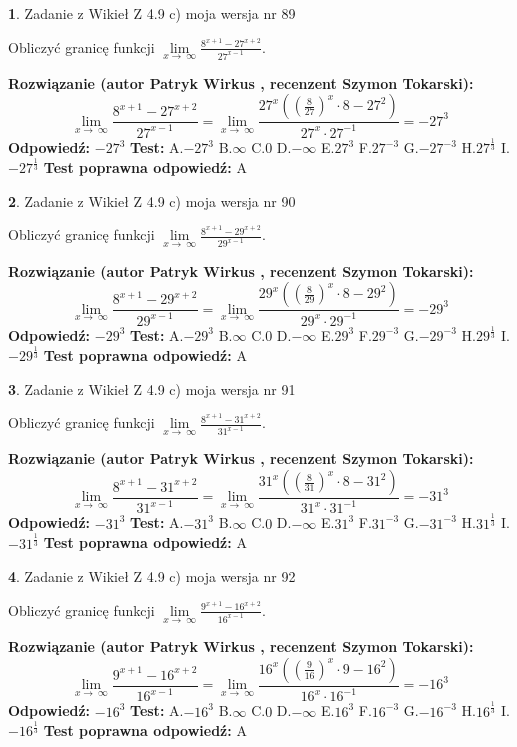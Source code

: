 \documentclass[12pt, a4paper]{article}
\theoremstyle{definition} %
\newtheorem{zad}{}
\newcommand{\zadStart}[1]{\begin{zad}#1\newline}
\newcommand{\zadStop}{\end{zad}}
\newcommand{\rozwStart}[2]{\noindent \textbf{Rozwiązanie (autor #1 , recenzent #2): }\newline}
\newcommand{\rozwStop}{\newline}
\newcommand{\odpStart}{\noindent \textbf{Odpowiedź:}\newline}
\newcommand{\odpStop}{\newline}
\newcommand{\testStart}{\noindent \textbf{Test:}\newline}
\newcommand{\testStop}{\newline}
\newcommand{\kluczStart}{\noindent \textbf{Test poprawna odpowiedź:}\newline}
\newcommand{\kluczStop}{\newline}
\begin{document}
\zadStart{Zadanie z Wikieł Z 4.9 c) moja wersja nr 89}


Obliczyć granicę funkcji  $\lim\limits_{x\to\ \infty}\frac{8^{x+1}-27^{x+2}}{27^{x-1}}$.
\zadStop
\rozwStart{Patryk Wirkus}{Szymon Tokarski}
$$\lim\limits_{x\to\ \infty}\frac{8^{x+1}-27^{x+2}}{27^{x-1}}=\lim\limits_{x\to\ \infty}\frac{27^{x}((\frac{8}{27})^{x}\cdot 8 -27^{2})}{27^{x}\cdot 27^{-1}} = -27^{3}$$
\rozwStop
\odpStart
$-27^{3}$
\odpStop
\testStart
A.$-27^{3}$ B.$\infty$ C.$0$ D.$-\infty$ E.$27^{3}$
F.$27^{-3}$ G.$-27^{-3}$
H.$27^{\frac{1}{3}}$
I.$-27^{\frac{1}{3}}$
\testStop
\kluczStart
A
\kluczStop



\zadStart{Zadanie z Wikieł Z 4.9 c) moja wersja nr 90}


Obliczyć granicę funkcji  $\lim\limits_{x\to\ \infty}\frac{8^{x+1}-29^{x+2}}{29^{x-1}}$.
\zadStop
\rozwStart{Patryk Wirkus}{Szymon Tokarski}
$$\lim\limits_{x\to\ \infty}\frac{8^{x+1}-29^{x+2}}{29^{x-1}}=\lim\limits_{x\to\ \infty}\frac{29^{x}((\frac{8}{29})^{x}\cdot 8 -29^{2})}{29^{x}\cdot 29^{-1}} = -29^{3}$$
\rozwStop
\odpStart
$-29^{3}$
\odpStop
\testStart
A.$-29^{3}$ B.$\infty$ C.$0$ D.$-\infty$ E.$29^{3}$
F.$29^{-3}$ G.$-29^{-3}$
H.$29^{\frac{1}{3}}$
I.$-29^{\frac{1}{3}}$
\testStop
\kluczStart
A
\kluczStop



\zadStart{Zadanie z Wikieł Z 4.9 c) moja wersja nr 91}


Obliczyć granicę funkcji  $\lim\limits_{x\to\ \infty}\frac{8^{x+1}-31^{x+2}}{31^{x-1}}$.
\zadStop
\rozwStart{Patryk Wirkus}{Szymon Tokarski}
$$\lim\limits_{x\to\ \infty}\frac{8^{x+1}-31^{x+2}}{31^{x-1}}=\lim\limits_{x\to\ \infty}\frac{31^{x}((\frac{8}{31})^{x}\cdot 8 -31^{2})}{31^{x}\cdot 31^{-1}} = -31^{3}$$
\rozwStop
\odpStart
$-31^{3}$
\odpStop
\testStart
A.$-31^{3}$ B.$\infty$ C.$0$ D.$-\infty$ E.$31^{3}$
F.$31^{-3}$ G.$-31^{-3}$
H.$31^{\frac{1}{3}}$
I.$-31^{\frac{1}{3}}$
\testStop
\kluczStart
A
\kluczStop



\zadStart{Zadanie z Wikieł Z 4.9 c) moja wersja nr 92}


Obliczyć granicę funkcji  $\lim\limits_{x\to\ \infty}\frac{9^{x+1}-16^{x+2}}{16^{x-1}}$.
\zadStop
\rozwStart{Patryk Wirkus}{Szymon Tokarski}
$$\lim\limits_{x\to\ \infty}\frac{9^{x+1}-16^{x+2}}{16^{x-1}}=\lim\limits_{x\to\ \infty}\frac{16^{x}((\frac{9}{16})^{x}\cdot 9 -16^{2})}{16^{x}\cdot 16^{-1}} = -16^{3}$$
\rozwStop
\odpStart
$-16^{3}$
\odpStop
\testStart
A.$-16^{3}$ B.$\infty$ C.$0$ D.$-\infty$ E.$16^{3}$
F.$16^{-3}$ G.$-16^{-3}$
H.$16^{\frac{1}{3}}$
I.$-16^{\frac{1}{3}}$
\testStop
\kluczStart
A
\kluczStop
\end{document}
